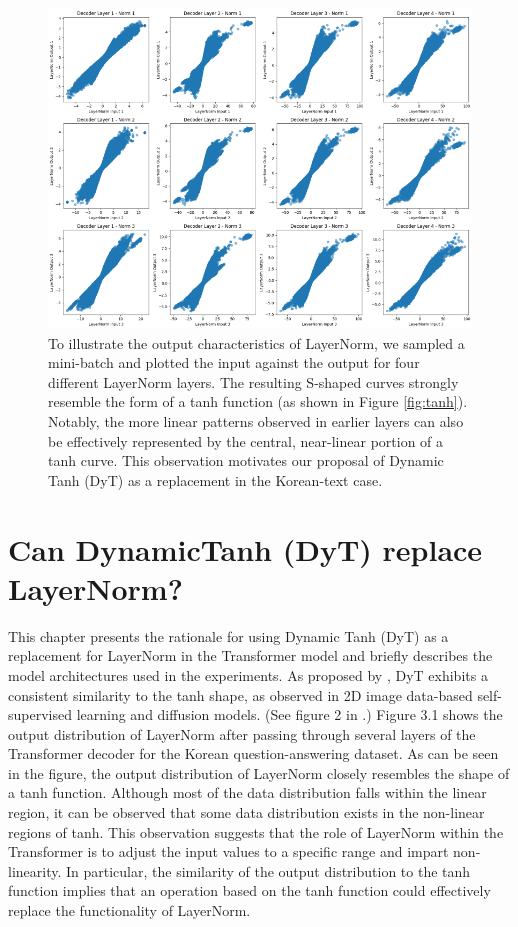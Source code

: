 \documentclass{article}
\begin{document}
\begin{figure}
    \centering    \includegraphics[width=1\linewidth]{figure_layernorm_decoder.png}
    \caption{To illustrate the output characteristics of LayerNorm, we sampled a mini-batch and plotted the input against the output for four different LayerNorm layers. The resulting S-shaped curves strongly resemble the form of a tanh function (as shown in Figure \ref{fig:tanh}). Notably, the more linear patterns observed in earlier layers can also be effectively represented by the central, near-linear portion of a tanh curve. This observation motivates our proposal of Dynamic Tanh (DyT) as a replacement in the Korean-text case.}    \label{fig:layernorm_decoder}
\end{figure}

\section{Can DynamicTanh (DyT) replace LayerNorm?}

This chapter presents the rationale for using Dynamic Tanh (DyT) as a replacement for LayerNorm in the Transformer model and briefly describes the model architectures used in the experiments. As proposed by \cite{zhu2025transformers}, DyT exhibits a consistent similarity to the tanh shape, as observed in 2D image data-based self-supervised learning and diffusion models. (See figure 2 in \cite{zhu2025transformers}.) Figure 3.1 shows the output distribution of LayerNorm after passing through several layers of the Transformer decoder for the Korean question-answering dataset. As can be seen in the figure, the output distribution of LayerNorm closely resembles the shape of a tanh function. Although most of the data distribution falls within the linear region, it can be observed that some data distribution exists in the non-linear regions of tanh. This observation suggests that the role of LayerNorm within the Transformer is to adjust the input values to a specific range and impart non-linearity. In particular, the similarity of the output distribution to the tanh function implies that an operation based on the tanh function could effectively replace the functionality of LayerNorm.
\end{document}
